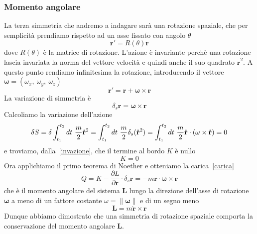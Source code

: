 \begin{example}
    \subsubsection{Momento angolare}
        La terza simmetria che andremo a indagare sarà una rotazione spaziale, che per semplicità prendiamo rispetto ad un asse fissato con angolo $\theta$
    \begin{equation*}
        \mathbf r' = R(\theta) \mathbf r
    \end{equation*}
        dove $R(\theta)$ è la matrice di rotazione. L'azione è invariante perchè una rotazione lascia invariata la norma del vettore velocità e quindi anche il suo quadrato $\mathbf{\dot r}^2$. A questo punto rendiamo infinitesima la rotazione, introducendo il vettore $\boldsymbol \omega = (\omega_x,~\omega_y,~\omega_z)$
    \begin{equation*}
        \mathbf r' = \mathbf r + \boldsymbol \omega \times \mathbf r
    \end{equation*}
        La variazione di simmetria è
    \begin{equation*}
        \delta_s \mathbf r = \boldsymbol \omega \times \mathbf r
    \end{equation*}
        Calcoliamo la variazione dell'azione
    \begin{equation*}
        \delta S = \delta \int_{t_1}^{t_2}dt~ \frac{m}{2} \mathbf{\dot r}^2 = \int_{t_1}^{t_2}dt~ \frac{m}{2} \delta_s (\mathbf{\dot r}^2) = \int_{t_1}^{t_2}dt~ \frac{m}{2} \mathbf{\dot r} \cdot (\omega \times \mathbf{\dot r} ) = 0
    \end{equation*}
        e troviamo, dalla~\eqref{invazione}, che il termine al bordo $K$ è nullo
    \begin{equation*}
        K = 0
    \end{equation*}
        Ora applichiamo il primo teorema di Noether e otteniamo la carica~\eqref{carica} 
    \begin{equation*}
        Q = K - \frac{\partial L}{\partial \mathbf{\dot r}} \cdot \delta_s \mathbf r = - m \mathbf{\dot r} \cdot \boldsymbol\omega \times \mathbf r 
    \end{equation*}
        che è il momento angolare del sistema $\mathbf L$ lungo la direzione dell'asse di rotazione $\boldsymbol \omega$ a meno di un fattore costante $\omega = \|\boldsymbol \omega\|$ e di un segno meno
    \begin{equation*}
        \mathbf L = m \mathbf{\dot r} \times \mathbf r
    \end{equation*}
        Dunque abbiamo dimostrato che una simmetria di rotazione spaziale comporta la conservazione del momento angolare $\mathbf L$.


\end{example}
